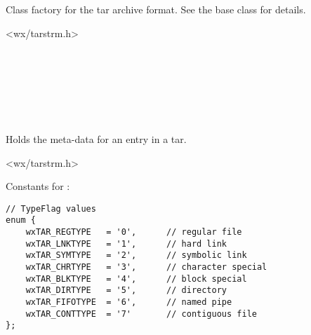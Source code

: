 %
%

\section{}\label{wxtarclassfactory}

Class factory for the tar archive format. See the base class
for details.




<wx/tarstrm.h>




\\
\\
\\
\\


%
%

\section{}\label{wxtarentry}

Holds the meta-data for an entry in a tar.




<wx/tarstrm.h>




Constants for :

\begin{verbatim}
// TypeFlag values
enum {
    wxTAR_REGTYPE   = '0',      // regular file
    wxTAR_LNKTYPE   = '1',      // hard link
    wxTAR_SYMTYPE   = '2',      // symbolic link
    wxTAR_CHRTYPE   = '3',      // character special
    wxTAR_BLKTYPE   = '4',      // block special
    wxTAR_DIRTYPE   = '5',      // directory
    wxTAR_FIFOTYPE  = '6',      // named pipe
    wxTAR_CONTTYPE  = '7'       // contiguous file
};

\end{verbatim}

